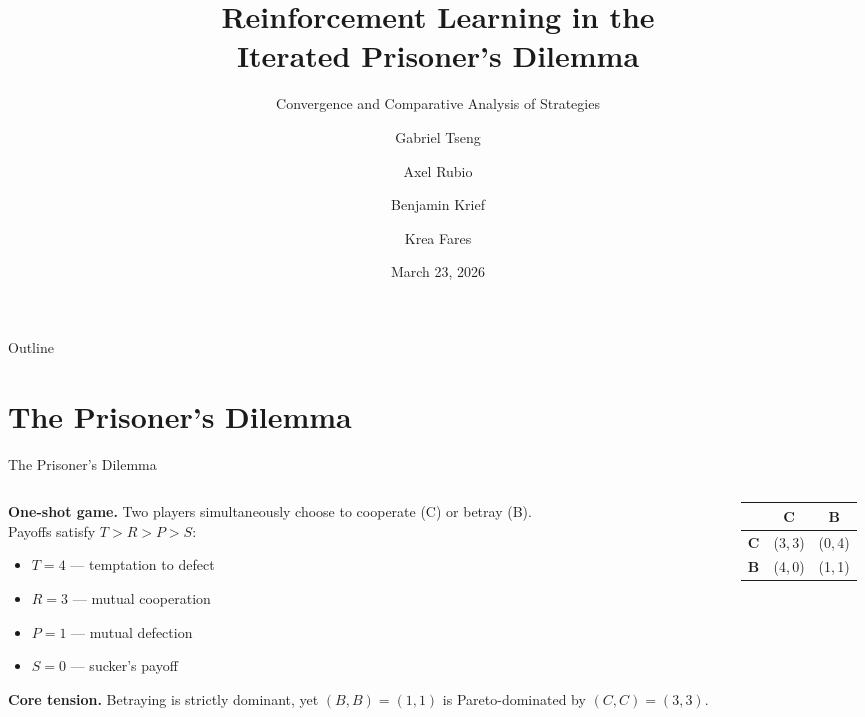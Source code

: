 \documentclass[10pt, aspectratio=169]{beamer}
\title{Reinforcement Learning in the\\Iterated Prisoner's Dilemma}
\subtitle{Convergence and Comparative Analysis of Strategies}
\author{Gabriel Tseng \and Axel Rubio \and Benjamin Krief \and Krea Fares}
\institute{Master 203 — Université Paris-Dauphine \\ Machine Learning Course}
\date{March 23, 2026}
\newcommand{\C}{\textbf{C}}
\newcommand{\B}{\textbf{B}}
\begin{document}
\maketitle

\begin{frame}{Outline}
  \tableofcontents[hideallsubsections]
\end{frame}

\section{The Prisoner's Dilemma}

\begin{frame}{The Prisoner's Dilemma}
  \begin{columns}[T]
    \begin{column}{0.52\textwidth}
      \textbf{One-shot game.} Two players simultaneously choose to \alert{cooperate (C)} or \alert{betray (B)}.\\[0.8em]

      Payoffs satisfy \(T > R > P > S\):
      \begin{itemize}
        \item \(T = 4\) — temptation to defect
        \item \(R = 3\) — mutual cooperation
        \item \(P = 1\) — mutual defection
        \item \(S = 0\) — sucker's payoff
      \end{itemize}
      \vspace{0.6em}
      \textbf{Core tension.} Betraying is strictly dominant, yet \((B,B) = (1,1)\) is Pareto-dominated by \((C,C) = (3,3)\).
    \end{column}
    \begin{column}{0.44\textwidth}
      \centering
      \vspace{0.5em}
      \begin{tabular}{lcc}
        \toprule
                    & \C     & \B     \\
        \midrule
        \C          & (3,\,3) & (0,\,4) \\
        \B          & (4,\,0) & (1,\,1) \\
        \bottomrule
      \end{tabular}
      \vspace{0.4em}
    \end{column}
  \end{columns}
\end{frame}
\end{document}
